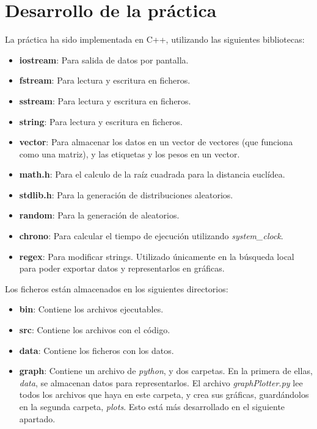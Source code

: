 \documentclass[11pt,a4paper]{article}
\begin{document}
\newpage
\section{Desarrollo de la práctica}

La práctica ha sido implementada en C++, utilizando las siguientes bibliotecas:
\begin{itemize}
\item \textbf{iostream}: Para salida de datos por pantalla.
\item \textbf{fstream}: Para lectura y escritura en ficheros.
\item \textbf{sstream}: Para lectura y escritura en ficheros.
\item \textbf{string}: Para lectura y escritura en ficheros.
\item \textbf{vector}: Para almacenar los datos en un vector de vectores (que funciona como una matriz), y las etiquetas y los pesos en un vector.
\item \textbf{math.h}: Para el calculo de la raíz cuadrada para la distancia euclídea.
\item \textbf{stdlib.h}: Para la generación de distribuciones aleatorios.
\item \textbf{random}: Para la generación de aleatorios.
\item \textbf{chrono}: Para calcular el tiempo de ejecución utilizando \emph{system\_clock}.
\item \textbf{regex}: Para modificar strings. Utilizado únicamente en la búsqueda local para poder exportar datos y representarlos en gráficas.
\end{itemize}

Los ficheros están almacenados en los siguientes directorios:
\begin{itemize}
\item \textbf{bin}: Contiene los archivos ejecutables.
\item \textbf{src}: Contiene los archivos con el código.
\item \textbf{data}: Contiene los ficheros con los datos.
\item \textbf{graph}: Contiene un archivo de \emph{python}, y dos carpetas. En la primera de ellas, \emph{data}, se almacenan datos para representarlos. El archivo \emph{graphPlotter.py} lee todos los archivos que haya en este carpeta, y crea sus gráficas, guardándolos en la segunda carpeta, \emph{plots}. Esto está más desarrollado en el siguiente apartado.
\end{itemize}
\end{document}
